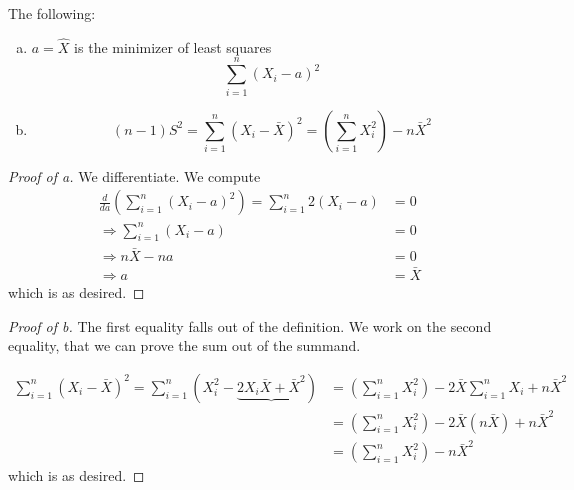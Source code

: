 \begin{theorem}
    The following:
    \begin{enumerate}[a)]
        \item $a = \hat X$ is the minimizer of least squares
              \[\sum^n_{i=1}(X_i - a)^2\]
        \item \[(n-1)S^2 = \sum^n_{i=1}(X_i - \bar X)^2 = \left(\sum^n_{i=1}X_i^2\right) - n\bar{X}^2\]
    \end{enumerate}
\end{theorem}

\begin{proof}[Proof of a]
    We differentiate. We compute
    \begin{align*}
        \frac{d}{da}\left( \sum^n_{i=1}(X_i - a)^2 \right) = \sum^n_{i=1} 2(X_i - a) & = 0       \\
        \Rightarrow \sum^n_{i=1}(X_i - a)                                            & = 0       \\
        \Rightarrow n\bar{X} - na                                                    & = 0       \\
        \Rightarrow a                                                                & = \bar{X}
    \end{align*}
    which is as desired.
\end{proof}
\begin{proof}[Proof of b]
    The first equality falls out of the definition. We work on the second equality, that we can prove the sum out of the summand.

    \begin{align*}
        \sum^n_{i=1}(X_i - \bar{X})^2 = \sum^n_{i=1}(X_i^2 - \underbrace{2X_i \bar{X} + \bar{X}^2}) & = \left( \sum^n_{i=1}X_i^2 \right) - 2\bar{X} \sum^n_{i=1}X_i + n\bar{X}^2 \\
                                                                                                    & = \left( \sum^n_{i=1}X_i^2 \right) - 2\bar{X}(n\bar{X}) + n\bar{X}^2       \\
                                                                                                    & = \left( \sum^n_{i=1}X_i^2 \right) - n\bar{X}^2
    \end{align*}
    which is as desired.
\end{proof}

